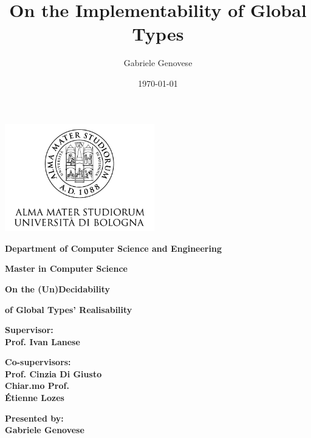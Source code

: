 \documentclass[12pt,a4paper,twoside]{book}
\title{On the Implementability of Global Types}
\author{Gabriele Genovese}
\date{\today}
\theoremstyle{definition}
\theoremstyle{definition}
\theoremstyle{definition}
\begin{document}
\begin{titlepage}
\begin{center}
    \includegraphics[width=6.5cm,height=4.7cm]{img/unibo.png}
    
    \vspace{10mm}
   
    {\large{\bf{Department of Computer Science and Engineering}}} 
    
    \vspace{5mm}

    {\Large{\bf{Master in Computer Science}}}
    
    \vspace{15mm}
    
    {\Huge{\bf On the (Un)Decidability }}\\
    
    \vspace{3mm}
    
    {\Huge{\bf of Global Types' Realisability }}\\
   
    \vspace{3mm}
\end{center}

\vspace{10mm}

\begin{minipage}[t]{0.45\textwidth}
    
    {\large{\bf Supervisor: \\ Prof. Ivan Lanese}}
    
    \vspace{3mm}
    
    {\large{\bf Co-supervisors:\\Prof. Cinzia Di Giusto\\Chiar.mo Prof.\\Étienne Lozes}}
\end{minipage}
\hfill
\begin{minipage}[t]{0.37\textwidth}\raggedleft
    {\large{\bf Presented by: \\ Gabriele Genovese}}\\
    

\end{minipage}
\end{titlepage}
\end{document}
